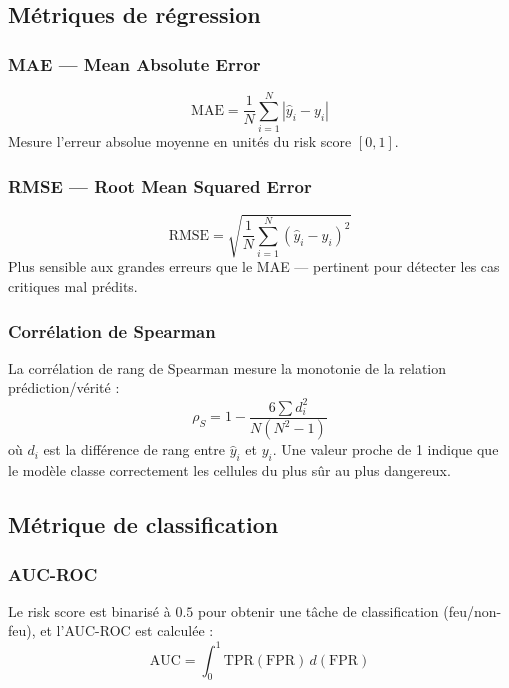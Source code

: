 \documentclass[12pt,a4paper]{report}
\begin{document}
\subsection{Métriques de régression}

\subsubsection{MAE — Mean Absolute Error}
\begin{equation}
  \text{MAE} = \frac{1}{N} \sum_{i=1}^{N} |\hat{y}_i - y_i|
\end{equation}
Mesure l'erreur absolue moyenne en unités du risk score $[0,1]$.

\subsubsection{RMSE — Root Mean Squared Error}
\begin{equation}
  \text{RMSE} = \sqrt{\frac{1}{N} \sum_{i=1}^{N} (\hat{y}_i - y_i)^2}
\end{equation}
Plus sensible aux grandes erreurs que le MAE — pertinent pour détecter les cas critiques
mal prédits.

\subsubsection{Corrélation de Spearman}

La corrélation de rang de Spearman mesure la monotonie de la relation prédiction/vérité :
\begin{equation}
  \rho_S = 1 - \frac{6 \sum d_i^2}{N(N^2 - 1)}
\end{equation}
où $d_i$ est la différence de rang entre $\hat{y}_i$ et $y_i$. Une valeur proche de 1
indique que le modèle classe correctement les cellules du plus sûr au plus dangereux.

\subsection{Métrique de classification}

\subsubsection{AUC-ROC}

Le risk score est binarisé à $0.5$ pour obtenir une tâche de classification
(feu/non-feu), et l'AUC-ROC est calculée :
\begin{equation}
  \text{AUC} = \int_0^1 \text{TPR}(\text{FPR}) \, d(\text{FPR})
\end{equation}
\end{document}

